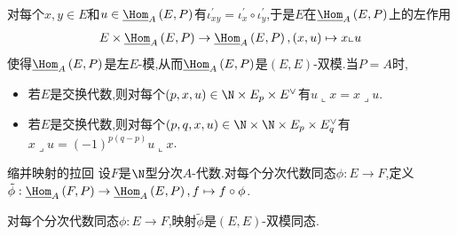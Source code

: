 \begin{remark}{}{}
	对每个$x,y\in E$和$u\in\underline{\Hom}_{A}\left(E,P\right)$有$\iota_{xy}^{\prime}=\iota_{x}^{\prime}\circ\iota_{y}^{\prime}$,于是$E$在$\underline{\Hom}_{A}\left(E,P\right)$上的左作用
	\begin{align*}
		E\times\underline{\Hom}_{A}\left(E,P\right)\to\underline{\Hom}_{A}\left(E,P\right),\left(x,u\right)\mapsto x\llcorner u
	\end{align*}
	使得$\underline{\Hom}_{A}\left(E,P\right)$是左$E$-模,从而$\underline{\Hom}_{A}\left(E,P\right)$是$\left(E,E\right)$-双模.当$P=A$时,
	\begin{itemize}
		\item 若$E$是交换代数,则对每个$\left(p,x,u\right)\in \N\times E_{p}\times E^{\vee}$有$u\llcorner x=x\lrcorner u$.
		\item 若$E$是交换代数,则对每个$\left(p,q,x,u\right)\in \N\times\N\times E_{p}\times E_{q}^{\vee}$有$x\lrcorner u=\left(-1\right)^{p\left(q-p\right)}u\llcorner x$.
	\end{itemize}
\end{remark}

\begin{definition}{缩并映射的拉回}{}
	设$F$是$\N$型分次$A$-代数.对每个分次代数同态$\phi:E\to F$,定义$\tilde{\phi}:\underline{\Hom}_{A}\left(F,P\right)\to\underline{\Hom}_{A}\left(E,P\right),f\mapsto f\circ\phi$.
\end{definition}

\begin{remark}{}{}
	对每个分次代数同态$\phi:E\to F$,映射$\tilde{\phi}$是$\left(E,E\right)$-双模同态.
\end{remark}

